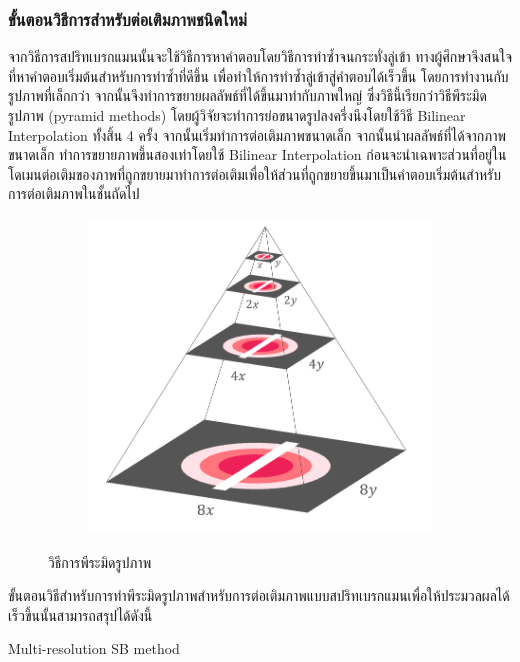 \documentclass[hidelinks, a4paper,12pt]{article}
\numberwithin{equation}{section}							%
\numberwithin{equation}{section}
\begin{document}
{	\subsubsection{ขั้นตอนวิธีการสำหรับต่อเติมภาพชนิดใหม่}
	\hspace{1cm} จากวิธีการสปริทเบรกแมนนั้นจะใช้วิธีการหาคำตอบโดยวิธีการทำซ้ำจนกระทั่งลู่เข้า ทางผู้ศึกษาจึงสนใจที่หาคำตอบเริ่มต้นสำหรับการทำซ้ำที่ดีขึ้น เพื่อทำให้การทำซ้ำลู่เข้าสู่คำตอบได้เร็วขึ้น โดยการทำงานกับรูปภาพที่เล็กกว่า จากนั้นจึงทำการขยายผลลัพธ์ที่ได้ขึ้นมาทำกับภาพใหญ่ ซึ่งวิธีนี้เรียกว่าวิธีพีระมิดรูปภาพ (pyramid methods) \cite{ref:image-pyramid}  โดยผู้วิจัยจะทำการย่อขนาดรูปลงครึ่งนึงโดยใช้วิธี Bilinear Interpolation ทั้งสิ้น 4 ครั้ง จากนั้นเริ่มทำการต่อเติมภาพขนาดเล็ก จากนั้นนำผลลัพธ์ที่ได้จากภาพขนาดเล็ก ทำการขยายภาพขึ้นสองเท่าโดยใช้ Bilinear Interpolation
	 ก่อนจะนำเฉพาะส่วนที่อยู่ในโดเมนต่อเติมของภาพที่ถูกขยายมาทำการต่อเติมเพื่อให้ส่วนที่ถูกขยายขึ้นมาเป็นคำตอบเริ่มต้นสำหรับการต่อเติมภาพในชั้นถัดไป
	 	\begin{figure}[H]
	 	\centering
	 	\begin{subfigure}{0.4\linewidth}
	 		\centering
	 		\includegraphics[width=0.8\linewidth]{images/image_inpaint_synthetic/image_pyramid.png}
	 	\end{subfigure}
 		 \caption{วิธีการพีระมิดรูปภาพ}
	 \end{figure}
 	\hspace{1cm} ขั้นตอนวิธีสำหรับการทำพีระมิดรูปภาพสำหรับการต่อเติมภาพแบบสปริทเบรกแมนเพื่อให้ประมวลผลได้เร็วขึ้นนั้นสามารถสรุปได้ดังนี้
	\begin{algorithm}[H]
		\label{algo:MultiSplitBregmanColorInpaint}
		\caption{Multi-resolution SB method}

\end{algorithm}}
\end{document}
